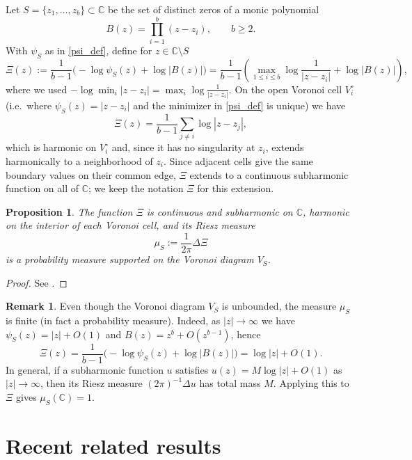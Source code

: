 \documentclass[12pt]{article}
\theoremstyle{plain}
\newtheorem{proposition}[theorem]{Proposition}
\theoremstyle{definition}
\newtheorem{remark}[theorem]{Remark}
\begin{document}
Let $S=\{z_1,\ldots,z_b\}\subset\mathbb C$ be the set of distinct zeros of a monic polynomial
$$B(z)=\prod_{i=1}^{b}(z-z_i),\qquad b\ge 2.$$
With $\psi_S$ as in \eqref{psi_def}, define for $z\in\mathbb C\setminus S$
\begin{equation}\label{defXi}
\Xi(z):=\frac{1}{b-1}\bigl(-\log\psi_S(z)+\log|B(z)|\bigr)
=\frac{1}{b-1}\left(\max_{1\le i\le b}\log\frac{1}{|z-z_i|}+\log|B(z)|\right),
\end{equation}
where we used $-\log\min_i|z-z_i|=\max_i\log\frac{1}{|z-z_i|}$.
On the open Voronoi cell $V_i^\circ$ (i.e.\ where $\psi_S(z)=|z-z_i|$ and the minimizer in \eqref{psi_def} is unique) we have
$$\Xi(z)=\frac{1}{b-1}\sum_{j\ne i}\log|z-z_j|,$$
which is harmonic on $V_i^\circ$ and, since it has no singularity at $z_i$, extends harmonically to a neighborhood of $z_i$.
Since adjacent cells give the same boundary values on their common edge, $\Xi$ extends to a continuous subharmonic function on all of $\mathbb C$; we keep the notation $\Xi$ for this extension.

\begin{proposition}\label{prop0}
The function $\Xi$ is continuous and subharmonic on $\mathbb C$, harmonic on the interior of each Voronoi cell, and its Riesz measure
\begin{equation}\label{zcma1}
\mu_S:=\frac{1}{2\pi}\Delta\Xi
\end{equation}
is a probability measure supported on the Voronoi diagram $V_S$.
\end{proposition}

\begin{proof}
See \cite[Prop.~2.2]{B:H}.
\end{proof}

\begin{remark}
Even though the Voronoi diagram $V_S$ is unbounded, the measure $\mu_S$ is finite (in fact a probability measure). Indeed, as $|z|\to\infty$ we have $\psi_S(z)=|z|+O(1)$ and $B(z)=z^b+O(z^{b-1})$, hence
$$\Xi(z)=\frac{1}{b-1}\bigl(-\log\psi_S(z)+\log|B(z)|\bigr)=\log|z|+O(1).$$
In general, if a subharmonic function $u$ satisfies $u(z)=M\log|z|+O(1)$ as $|z|\to\infty$, then its Riesz measure $(2\pi)^{-1}\Delta u$ has total mass $M$. Applying this to $\Xi$ gives $\mu_S(\mathbb C)=1$.
\end{remark}

\section{Recent related results}\label{sec3}
\end{document}
